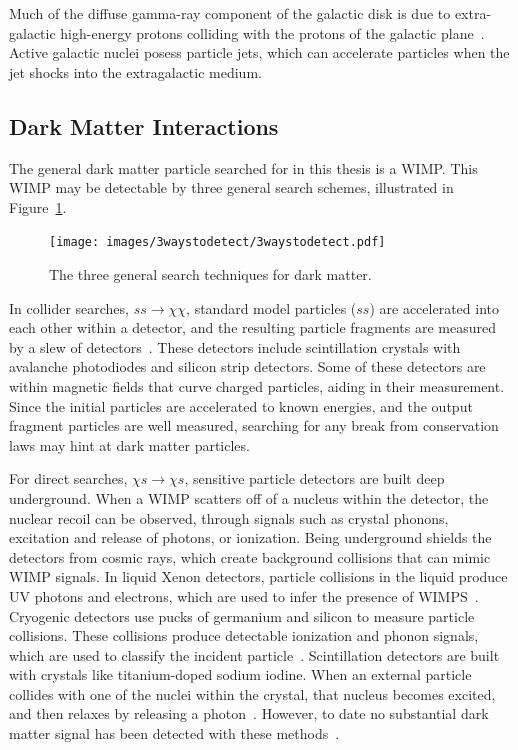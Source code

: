  Much of the diffuse gamma-ray component of the galactic disk is due to extra-galactic high-energy protons colliding with the protons of the galactic plane~\cite{GalacticDiffuseGammaRays,extragalactic_agn}.
  Active galactic nuclei posess particle jets, which can accelerate particles when the jet shocks into the extragalactic medium.

  \subsection{Dark Matter Interactions}\label{dmgammaproduction}
    
    The general dark matter particle searched for in this thesis is a WIMP.
    This WIMP may be detectable by three general search schemes, illustrated in Figure~\ref{fig:3_searches}.

    \begin{figure}[ht]
      \centering
      \texttt{[image: images/3waystodetect/3waystodetect.pdf]}
      \caption[Three Search Techniques]{
        The three general search techniques for dark matter.}
      \label{fig:3_searches}
    \end{figure}
    
    In collider searches, $ss \rightarrow \chi\chi$, standard model particles ($ss$) are accelerated into each other within a detector, and the resulting particle fragments are measured by a slew of detectors~\cite{atlas,cms}.
    These detectors include scintillation crystals with avalanche photodiodes and silicon strip detectors.
    Some of these detectors are within magnetic fields that curve charged particles, aiding in their measurement.
    Since the initial particles are accelerated to known energies, and the output fragment particles are well measured, searching for any break from conservation laws may hint at dark matter particles. 
    
    For direct searches, $\chi s \rightarrow \chi s$, sensitive particle detectors are built deep underground.
    When a WIMP scatters off of a nucleus within the detector, the nuclear recoil can be observed, through signals such as crystal phonons, excitation and release of photons, or ionization.
    Being underground shields the detectors from cosmic rays, which create background collisions that can mimic WIMP signals.
    In liquid Xenon detectors, particle collisions in the liquid produce UV photons and electrons, which are used to infer the presence of WIMPS~\cite{direct_lux,direct_xenon}.
    Cryogenic detectors use pucks of germanium and silicon to measure particle collisions.
    These collisions produce detectable ionization and phonon signals, which are used to classify the incident particle~\cite{direct_cdms}.
    Scintillation detectors are built with crystals like titanium-doped sodium iodine.
    When an external particle collides with one of the nuclei within the crystal, that nucleus becomes excited, and then relaxes by releasing a photon~\cite{direct_dama}.
    However, to date no substantial dark matter signal has been detected with these methods~\cite{direct_dm_detection}.
    
